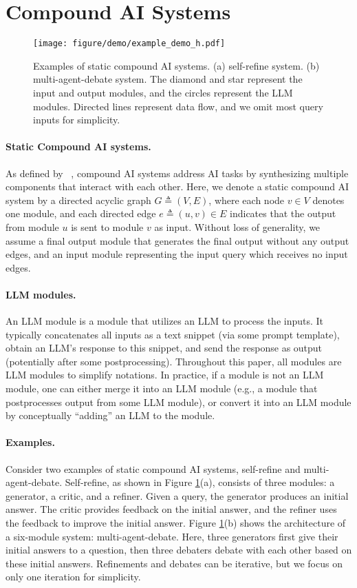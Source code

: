 \section{Compound AI Systems}\label{sec:deluxeagent:Prelim}
\begin{figure}[ht]
    \centering
    \texttt{[image: figure/demo/example\_demo\_h.pdf]}
    \caption{Examples of static compound AI systems. (a) self-refine system. (b)  multi-agent-debate system. The diamond and star represent the input and output modules, and the circles represent the LLM modules. Directed lines represent data flow, and we omit most query inputs for simplicity.}
    \label{fig:deluxeagent:demo}
\end{figure}
\paragraph{Static Compound AI systems.} As defined by ~\cite{compound-ai-blog}, compound AI systems address AI tasks by synthesizing multiple components that interact with each other. Here, we denote a static compound AI system by a directed acyclic graph $G\triangleq (V,E)$, where each node $v\in V$ denotes one module, and each directed edge $e\triangleq (u,v)\in E$ indicates that the output from module $u$ is sent to module $v$ as input. Without loss of generality, we assume a final output module that generates the final output without any output edges, and an input module representing the input query which receives no input edges. 

\paragraph{LLM modules.} An LLM module is a module that utilizes an LLM to process the inputs. It typically concatenates all inputs as a text snippet (via some prompt template), obtain an LLM's response to this snippet, and send the response as output (potentially after some postprocessing). Throughout this paper, all modules are LLM modules to simplify notations. In practice, if a  module is not an LLM module, one can either merge it into an LLM module (e.g., a module that postprocesses output from some LLM module), or convert it into an LLM module by conceptually ``adding'' an LLM to the module.

\paragraph{Examples.} Consider two examples of static compound AI systems, self-refine and multi-agent-debate. Self-refine, as shown in Figure \ref{fig:deluxeagent:demo}(a), consists of three modules: a generator, a critic, and a refiner. Given a query, the generator produces an initial answer. The critic provides feedback on the initial answer, and the refiner uses the feedback to improve the initial answer. Figure \ref{fig:deluxeagent:demo}(b) shows the architecture of a six-module system: multi-agent-debate. Here, three generators first give their initial answers to a question, then three debaters debate with each other based on these initial answers. Refinements and debates can be iterative, but we focus on only one iteration for simplicity.  

